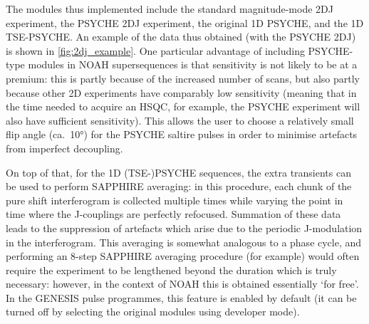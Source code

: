 The modules thus implemented include the standard magnitude-mode 2DJ experiment, the PSYCHE 2DJ experiment\autocite{Foroozandeh2015CC}, the original 1D PSYCHE\autocite{Foroozandeh2014ACIE}, and the 1D TSE-PSYCHE\autocite{Foroozandeh2015CC}.
An example of the data thus obtained (with the PSYCHE 2DJ) is shown in \cref{fig:2dj_example}.
One particular advantage of including PSYCHE-type modules in NOAH supersequences is that sensitivity is not likely to be at a premium: this is partly because of the increased number of scans, but also partly because other 2D experiments have comparably low sensitivity (meaning that in the time needed to acquire an HSQC, for example, the PSYCHE experiment will also have sufficient sensitivity).
This allows the user to choose a relatively small flip angle (ca.\ \ang{10}) for the PSYCHE saltire pulses in order to minimise artefacts from imperfect decoupling.

On top of that, for the 1D (TSE-)PSYCHE sequences, the extra transients can be used to perform SAPPHIRE averaging\autocite{Moutzouri2017CC}: in this procedure, each chunk of the pure shift interferogram is collected multiple times while varying the point in time where the J-couplings are perfectly refocused.
Summation of these data leads to the suppression of artefacts which arise due to the periodic J-modulation in the interferogram.
This averaging is somewhat analogous to a phase cycle, and performing an 8-step SAPPHIRE averaging procedure (for example) would often require the experiment to be lengthened beyond the duration which is truly necessary: however, in the context of NOAH this is obtained essentially `for free'.
In the GENESIS pulse programmes, this feature is enabled by default (it can be turned off by selecting the original modules using developer mode).

